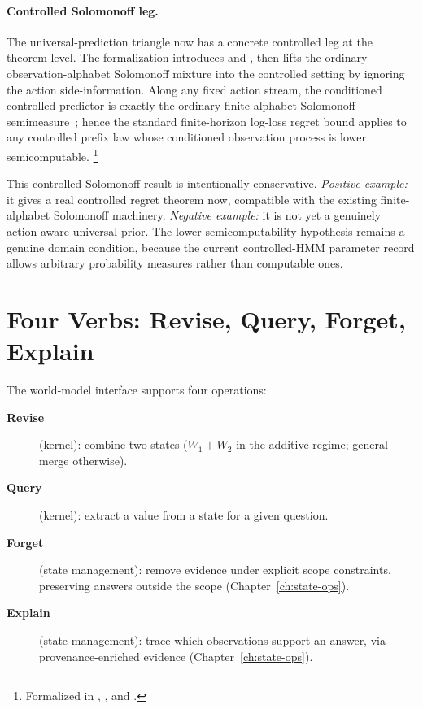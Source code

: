 \documentclass[11pt,openany]{report}
\begin{document}
\paragraph{Controlled Solomonoff leg.}
The universal-prediction triangle now has a concrete controlled leg at
the theorem level.  The formalization introduces
 and , then
lifts the ordinary observation-alphabet Solomonoff mixture into the
controlled setting by ignoring the action side-information.  Along any
fixed action stream, the conditioned controlled predictor is exactly
the ordinary finite-alphabet Solomonoff semimeasure~; hence
the standard finite-horizon log-loss regret bound applies to any
controlled prefix law whose conditioned observation process is lower
semicomputable.%
\footnote{Formalized in
,
,
and
.}

\medskip\noindent
This controlled Solomonoff result is intentionally conservative.
\emph{Positive example:} it gives a real controlled regret theorem now,
compatible with the existing finite-alphabet Solomonoff machinery.
\emph{Negative example:} it is not yet a genuinely action-aware
universal prior.  The lower-semicomputability hypothesis remains a
genuine domain condition, because the current controlled-HMM parameter
record allows arbitrary probability measures rather than computable
ones.

\section{Four Verbs: Revise, Query, Forget, Explain}

The world-model interface supports four operations:

\begin{description}
\item[\textbf{Revise}] (kernel): combine two states ($W_1 + W_2$ in
  the additive regime; general merge otherwise).

\item[\textbf{Query}] (kernel): extract a value from a state for a
  given question.

\item[\textbf{Forget}] (state management): remove evidence under
  explicit scope constraints, preserving answers outside the scope
  (Chapter~\ref{ch:state-ops}).

\item[\textbf{Explain}] (state management): trace which observations
  support an answer, via provenance-enriched evidence
  (Chapter~\ref{ch:state-ops}).
\end{description}
\end{document}
